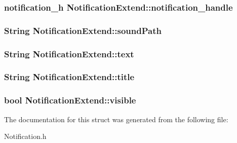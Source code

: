 \subsubsection[{notification\-\_\-handle}]{\setlength{\rightskip}{0pt plus 5cm}notification\-\_\-h Notification\-Extend\-::notification\-\_\-handle}\label{structNotificationExtend_a7bb9c3039ee72189f0c737cff2537562}
\subsubsection[{sound\-Path}]{\setlength{\rightskip}{0pt plus 5cm}String Notification\-Extend\-::sound\-Path}\label{structNotificationExtend_a200f522707abb1e267f3fe578e053352}
\subsubsection[{text}]{\setlength{\rightskip}{0pt plus 5cm}String Notification\-Extend\-::text}\label{structNotificationExtend_a76e3cba8846b22804a1961aceefab4b6}
\subsubsection[{title}]{\setlength{\rightskip}{0pt plus 5cm}String Notification\-Extend\-::title}\label{structNotificationExtend_ac61e7d484abd16f74fc77973039744ae}
\subsubsection[{visible}]{\setlength{\rightskip}{0pt plus 5cm}bool Notification\-Extend\-::visible}\label{structNotificationExtend_a231f865350a68814f893279825b0f0f8}


The documentation for this struct was generated from the following file\-:\begin{DoxyCompactItemize}
\item 
Notification.\-h\end{DoxyCompactItemize}
